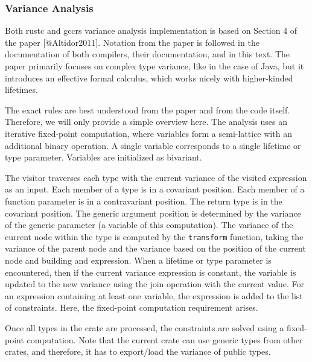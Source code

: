 \documentclass[
  11pt,
]{report}
\begin{document}
\subsubsection{Variance Analysis}\label{variance-analysis}

Both rustc and gccrs variance analysis implementation is based on
Section 4 of the paper {[}@Altidor2011{]}. Notation from the paper is
followed in the documentation of both compilers, their documentation,
and in this text. The paper primarily focuses on complex type variance,
like in the case of Java, but it introduces an effective formal
calculus, which works nicely with higher-kinded lifetimes.

The exact rules are best understood from the paper and from the code
itself. Therefore, we will only provide a simple overview here. The
analysis uses an iterative fixed-point computation, where variables form
a semi-lattice with an additional binary operation. A single variable
corresponds to a single lifetime or type parameter. Variables are
initialized as bivariant.

The visitor traverses each type with the current variance of the visited
expression as an input. Each member of a type is in a covariant
position. Each member of a function parameter is in a contravariant
position. The return type is in the covariant position. The generic
argument position is determined by the variance of the generic parameter
(a variable of this computation). The variance of the current node
within the type is computed by the \texttt{transform} function, taking
the variance of the parent node and the variance based on the position
of the current node and building and expression. When a lifetime or type
parameter is encountered, then if the current variance expression is
constant, the variable is updated to the new variance using the join
operation with the current value. For an expression containing at least
one variable, the expression is added to the list of constraints. Here,
the fixed-point computation requirement arises.

Once all types in the crate are processed, the constraints are solved
using a fixed-point computation. Note that the current crate can use
generic types from other crates, and therefore, it has to export/load
the variance of public types.
\end{document}
